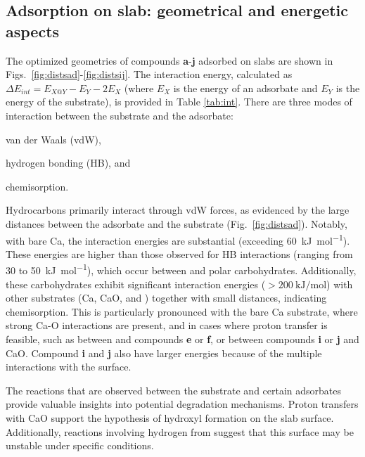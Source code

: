 \documentclass[journal=jpccck,manuscript=article]{achemso}
\begin{document}
\clearpage

\subsection{Adsorption on slab: geometrical and energetic aspects}

The optimized geometries of compounds \textbf{a}-\textbf{j} adsorbed on slabs are shown in Figs.~\ref{fig:distsad}-\ref{fig:distsij}. The interaction energy, calculated as $\Delta E_{int} = E_{X@Y} - E_Y - 2E_X$ (where $E_X$ is the energy of an adsorbate and $E_Y$ is the energy of the substrate), is provided in Table \ref{tab:int}. There are three modes of interaction between the substrate and the adsorbate: \begin{inparaenum}[i)]
	\item van der Waals (vdW),
	\item hydrogen bonding (HB), and
	\item chemisorption.
\end{inparaenum}

Hydrocarbons primarily interact through vdW forces, as evidenced by the large distances between the adsorbate and the substrate (Fig.~\ref{fig:distsad}). Notably, with bare Ca, the interaction energies are substantial (exceeding \SI{60}{\kilo\joule\per\mole}). These energies are higher than those observed for HB interactions (ranging from 30 to \SI{50}{\kilo\joule\per\mole}), which occur between  and polar carbohydrates. Additionally, these carbohydrates exhibit significant interaction energies ($>\SI{200}{\kilo\joule\per\mole}$) with other substrates (Ca, CaO, and ) together with small distances, indicating chemisorption. This is particularly pronounced with the bare Ca substrate, where strong Ca-O interactions are present, and in cases where proton transfer is feasible, such as between  and compounds \textbf{e} or \textbf{f}, or between compounds \textbf{i} or \textbf{j} and CaO. Compound \textbf{i} and \textbf{j} also have larger energies because of the multiple interactions with the surface.

The reactions that are observed between the substrate and certain adsorbates provide valuable insights into potential degradation mechanisms. Proton transfers with CaO support the hypothesis of hydroxyl formation on the slab surface. Additionally, reactions involving hydrogen from  suggest that this surface may be unstable under specific conditions.
\end{document}
